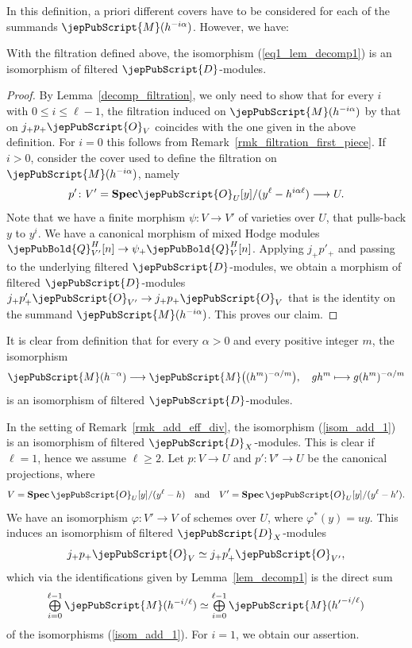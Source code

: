 In this definition, a priori different covers have to be considered for each of the summands $\jepPubScript{M}(h^{-i\alpha})$. However, 
we have:

\begin{lemma}\label{lem_decomp1_v2}
With the filtration defined above, the isomorphism (\ref{eq1_lem_decomp1}) is an isomorphism of filtered $\jepPubScript{D}$-modules. 
\end{lemma}
\begin{proof}
By Lemma~\ref{decomp_filtration}, we only need to show that for every $i$ with $0\leqslant i\leqslant \ell-1$, the filtration induced on $\jepPubScript{M}(h^{-i\alpha})$ by that on $j_+p_+\jepPubScript{O}_V$ coincides with the 
one given in the above definition. For $i=0$ this follows from Remark~\ref{rmk_filtration_first_piece}. If $i>0$, consider the cover used to define the filtration on 
$\jepPubScript{M}(h^{-i\alpha})$, namely 
$$p'\colon V'={\bf Spec}\jepPubScript{O}_U[y]/(y^{\ell}-h^{i\alpha\ell})\longrightarrow U.$$ 
Note that we have a finite morphism
$\psi\colon V\to V'$ of varieties over $U$, that pulls-back $y$ to $y^i$. We have a canonical morphism of mixed Hodge modules
$\jepPubBold{Q}_{V'}^H[n]\to \psi_+\jepPubBold{Q}_V^H[n]$. Applying $j_+p'_+$ and passing to the underlying filtered $\jepPubScript{D}$-modules, we obtain a morphism of filtered 
$\jepPubScript{D}$-modules $j_+p'_+\jepPubScript{O}_{V'}\to j_+p_+\jepPubScript{O}_V$ that is the identity on the summand $\jepPubScript{M}(h^{-i\alpha})$. This proves our claim.
\end{proof}

\begin{remark}\label{same_filtration_rescaling}
It is clear from definition that for every $\alpha>0$ and every positive integer $m$, the isomorphism
$$\jepPubScript{M}(h^{-\alpha})\longrightarrow \jepPubScript{M}\big((h^m)^{-\alpha/m}\big), \quad gh^m\longmapsto g (h^m)^{-\alpha/m}$$
is an isomorphism of filtered $\jepPubScript{D}$-modules. 
\end{remark}


\begin{remark}\label{rem_isom_comp_with_filtrations}
In the setting of Remark~\ref{rmk_add_eff_div},
the isomorphism (\ref{isom_add_1}) is an isomorphism of filtered $\jepPubScript{D}_X$-modules.
This is clear if $\ell=1$, hence we assume $\ell\geqslant 2$.
Let
$p\colon V\to U$ and $p'\colon V'\to U$ be the canonical projections, where
$$V={\bf Spec}\,\jepPubScript{O}_U[y]/(y^{\ell}-h)\quad\text{and}
\quad V'={\bf Spec}\,\jepPubScript{O}_U[y]/(y^{\ell}-h').$$
We have an isomorphism $\varphi\colon V'\to V$ of schemes over $U$, where $\varphi^*(y)=uy$. 
This induces an isomorphism of filtered $\jepPubScript{D}_X$-modules
$$j_+p_+\jepPubScript{O}_V\simeq j_+p'_+\jepPubScript{O}_{V'},$$
which via the identifications given by Lemma~\ref{lem_decomp1} is the direct sum
$$\mathop{\textstyle\bigoplus}\limits_{i=0}^{\ell-1}\jepPubScript{M}(h^{-i/\ell})\simeq 
\mathop{\textstyle\bigoplus}\limits_{i=0}^{\ell-1}\jepPubScript{M}({h'}^{-i/\ell})$$
of the isomorphisms (\ref{isom_add_1}). For $i=1$, we obtain our assertion.
\end{remark}

